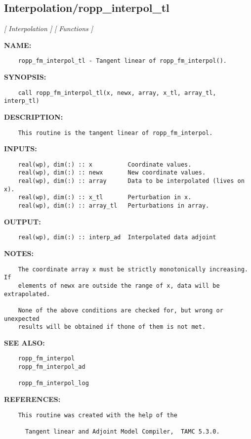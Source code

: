 \subsection{Interpolation/ropp\_interpol\_tl}
\textsl{[ Interpolation ]}
\textsl{[ Functions ]}

\label{ch:robo54}
\label{ch:Interpolation_ropp_interpol_tl}
\textbf{NAME:}\hspace{0.08in}\begin{Verbatim}
    ropp_fm_interpol_tl - Tangent linear of ropp_fm_interpol().
\end{Verbatim}
\textbf{SYNOPSIS:}\hspace{0.08in}\begin{Verbatim}
    call ropp_fm_interpol_tl(x, newx, array, x_tl, array_tl, interp_tl)
\end{Verbatim}
\textbf{DESCRIPTION:}\hspace{0.08in}\begin{Verbatim}
    This routine is the tangent linear of ropp_fm_interpol.
\end{Verbatim}
\textbf{INPUTS:}\hspace{0.08in}\begin{Verbatim}
    real(wp), dim(:) :: x          Coordinate values.
    real(wp), dim(:) :: newx       New coordinate values.
    real(wp), dim(:) :: array      Data to be interpolated (lives on x).
    real(wp), dim(:) :: x_tl       Perturbation in x.
    real(wp), dim(:) :: array_tl   Perturbations in array.
\end{Verbatim}
\textbf{OUTPUT:}\hspace{0.08in}\begin{Verbatim}
    real(wp), dim(:) :: interp_ad  Interpolated data adjoint
\end{Verbatim}
\textbf{NOTES:}\hspace{0.08in}\begin{Verbatim}
    The coordinate array x must be strictly monotonically increasing. If
    elements of newx are outside the range of x, data will be extrapolated.

    None of the above conditions are checked for, but wrong or unexpected
    results will be obtained if thone of them is not met. 
\end{Verbatim}
\textbf{SEE ALSO:}\hspace{0.08in}\begin{Verbatim}
    ropp_fm_interpol
    ropp_fm_interpol_ad

    ropp_fm_interpol_log
\end{Verbatim}
\textbf{REFERENCES:}\hspace{0.08in}\begin{Verbatim}
    This routine was created with the help of the 

      Tangent linear and Adjoint Model Compiler,  TAMC 5.3.0.
\end{Verbatim}
